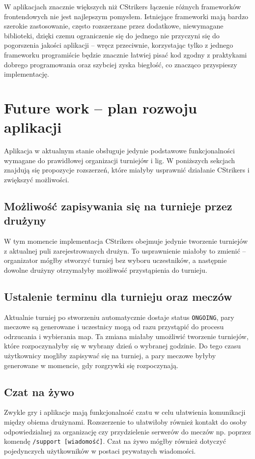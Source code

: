 \documentclass[shortabstract]{iithesis}
\theoremstyle{definition} \newtheorem{definition}{Definicja}[]
\theoremstyle{remark} \newtheorem{remark}[definition]{Observation}
\theoremstyle{plain} \newtheorem{theorem}[definition]{Theorem}
\theoremstyle{plain} \newtheorem{lemma}[definition]{Lemma}
\begin{document}
W aplikacjach znacznie większych niż CStrikers łączenie różnych frameworków frontendowych nie jest najlepszym pomysłem. Istniejące frameworki mają bardzo szerokie zastosowanie, często rozszerzane przez dodatkowe, niewymagane biblioteki, dzięki czemu ograniczenie się do jednego nie przyczyni się do pogorszenia jakości aplikacji -- wręcz przeciwnie, korzystając tylko z jednego frameworku programiście będzie znacznie łatwiej pisać kod zgodny z praktykami dobrego programowania oraz szybciej zyska biegłość, co znacząco przyspieszy implementację.

\section{Future work -- plan rozwoju aplikacji}
Aplikacja w aktualnym stanie obsługuje jedynie podstawowe funkcjonalności wymagane do prawidłowej organizacji turniejów i lig. W poniższych sekcjach znajdują się propozycje rozszerzeń, które miałyby usprawnić działanie CStrikers i zwiększyć możliwości.

\subsection{Możliwość zapisywania się na turnieje przez drużyny}
W tym momencie implementacja CStrikers obejmuje jedynie tworzenie turniejów z aktualnej puli zarejestrowanych drużyn. To usprawnienie miałoby to zmienić -- organizator mógłby stworzyć turniej bez wyboru uczestników, a następnie dowolne drużyny otrzymałyby możliwość przystąpienia do turnieju.

\subsection{Ustalenie terminu dla turnieju oraz meczów}
Aktualnie turniej po stworzeniu automatycznie dostaje status \texttt{ONGOING}, pary meczowe są generowane i uczestnicy mogą od razu przystąpić do procesu odrzucania i wybierania map. Ta zmiana miałaby umożliwić tworzenie turniejów, które rozpoczynałyby się w wybrany dzień o wybranej godzinie. Do tego czasu użytkownicy mogliby zapisywać się na turniej, a pary meczowe byłyby generowane w momencie, gdy rozgrywki się rozpoczynają.

\subsection{Czat na żywo}
Zwykle gry i aplikacje mają funkcjonalność czatu w celu ułatwienia komunikacji między obiema drużynami. Rozszerzenie to ułatwiłoby również kontakt do osoby odpowiedzialnej za organizację czy przydzielenie serwerów do meczów np. poprzez komendę \texttt{/support [wiadomość]}. Czat na żywo mógłby również dotyczyć pojedynczych użytkowników w postaci prywatnych wiadomości.
\end{document}
